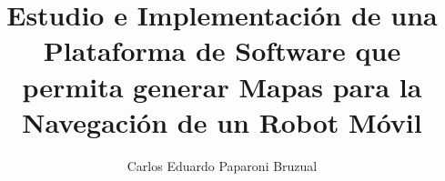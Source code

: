 \documentclass[12pt,oneside]{book}
\begin{document}
\frontmatter


\logoarriba{}




\title{Estudio e Implementación de una Plataforma de Software que permita generar Mapas para la Navegación de un Robot Móvil}

\author{Carlos Eduardo Paparoni Bruzual}





\end{document}
